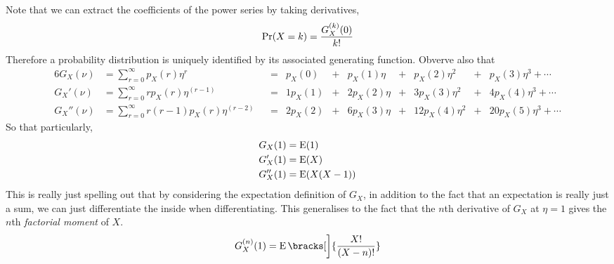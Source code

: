 Note that we can extract the coefficients of the power series by taking
derivatives,
\begin{equation*}
\operatorname{Pr}(X = k) = \frac{G_X^{(k)}(0)}{k!}
\end{equation*}
Therefore a probability distribution is uniquely identified by its associated
generating function. Obverve also that
\begin{alignat*}6
G_X(\nu) &= \sum_{r = 0}^\infty p_X(r)\eta^r
    &&={}& p_X(0) &+{}& p_X(1)\eta
    &+{}& p_X(2)\eta^2 &+{}& p_X(3) \eta^3 + \dotsb \\
G_X'(\nu) &= \sum_{r = 0}^\infty rp_X(r)\eta^{(r - 1)}
    &&={}& 1 p_X(1) &+{}& 2p_X(2)\eta
    &+{}& 3p_X(3) \eta^2 &+{}& 4p_X(4) \eta^3 + \dotsb \\
G_X''(\nu) &= \sum_{r = 0}^\infty r(r - 1)p_X(r)\eta^{(r - 2)}
    &&={}& 2 p_X(2) &+{}& 6p_X(3)\eta
    &+{}& 12p_X(4) \eta^2 &+{}& 20p_X(5) \eta^3 + \dotsb
\end{alignat*}
So that particularly,
\begin{align*}
G_X(1) &= \operatorname{E}(1) \\
G_X'(1) &= \operatorname{E}(X) \\
G_X''(1) &= \operatorname{E}(X(X - 1))
\end{align*}
This is really just spelling out that by considering the expectation definition
of \(G_X\), in addition to the fact that an expectation is really just a sum, we
can just differentiate the inside when differentiating. This generalises to the
fact that the \(n\)th derivative of \(G_X\) at \(\eta = 1\) gives the \(n\)th
\emph{factorial moment} of \(X\).
\begin{equation*}
    G_X^{(n)}(1) = \Expect\bracks[\bigg]{\frac{X!}{(X - n)!}}
\end{equation*}

